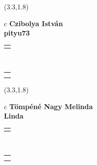 \documentclass[11pt]{article}
\begin{document}
\makebox(3.3,1.8){
  \renewcommand\arraystretch{1.3}
  \begin{tabular}[c]{c}
    \hspace{8.5mm}
    \LARGE\bf{ Czibolya István }\\
    \hspace{8.5mm}
    \Large{ pityu73 }\\
    \renewcommand\arraystretch{3}
    \begin{tabular}[c]{c}
      \centering
      \fontfamily{phv}\selectfont{
        \textbf{
          \textsc{
            \scriptsize{
            \color{Dark}{ Ismerkedő }\color{Dark}{ Webmester }\color{Bright}{ Sminkmester }\color{Bright}{ Programozó }
            }
          }
        }
      }
    \end{tabular}
    \\
    \renewcommand\arraystretch{1}
    \begin{tabular}{p{3.3in}}
      \hspace{.7cm}\\
      \hspace{.7cm}\emph{  }\\
    \end{tabular}
  \end{tabular}
}

\makebox(3.3,1.8){
  \renewcommand\arraystretch{1.3}
  \begin{tabular}[c]{c}
    \hspace{15mm}
    \LARGE\bf{Tömpéné Nagy Melinda}\\
    \hspace{8.5mm}
    \Large{ Linda }\\
    \renewcommand\arraystretch{3}
    \begin{tabular}[c]{c}
      \centering
      \fontfamily{phv}\selectfont{
        \textbf{
          \textsc{
            \scriptsize{
            \color{Dark}{ Ismerkedő }\color{Bright}{ Webmester }\color{Bright}{ Sminkmester }\color{Bright}{ Programozó }
            }
          }
        }
      }
    \end{tabular}
    \\
    \renewcommand\arraystretch{1}
    \begin{tabular}{p{3.3in}}
      \hspace{.7cm}\\
      \hspace{.7cm}\emph{  }\\
    \end{tabular}
  \end{tabular}
}
\end{document}
